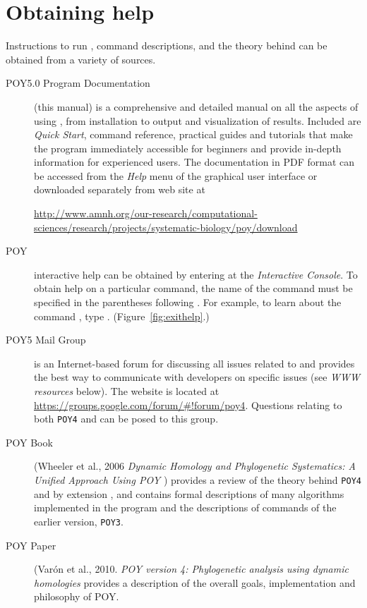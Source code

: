 {\section{Obtaining help} \label{sec:help}
Instructions to run \poy, command descriptions, and the theory behind \poy can be obtained from a variety of sources.
\begin{description}
\item[POY5.0 Program Documentation] (this manual) is a comprehensive and detailed manual on all the aspects of 
using \poy, from installation to output and visualization of results. Included are \emph{Quick Start}, \poy command 
reference, practical guides and tutorials that make the program immediately accessible for beginners and provide 
in-depth information for experienced users. The documentation in PDF format can be accessed from the \emph{Help} 
menu of the graphical user interface or downloaded separately from \poy web site at
\begin{center}
\url{http://www.amnh.org/our-research/computational-sciences/research/projects/systematic-biology/poy/download}
\end{center}
\item[POY] interactive help can be obtained by entering  at the \poy \emph{Interactive Console}. 
To obtain help on a particular command, the name of the command must be specified in the parentheses following 
. For example, to learn about the command , type . 
(Figure~\ref{fig:exithelp}.)
\item[POY5 Mail Group] is an Internet-based forum for discussing all issues related to \poy and provides the best way to 
communicate with \poy developers on specific issues (see \emph{WWW resources} below). The website is 
located at \url{https://groups.google.com/forum/#!forum/poy4}.  Questions relating to both \texttt{POY4} and \poy
can be posed to this group.
\item[POY Book] (Wheeler et al., 2006 \emph{Dynamic Homology and Phylogenetic Systematics: A Unified 
Approach Using POY} \cite{wheeleretal2006}) provides a review of the theory behind \texttt{POY4} and by extension 
\poy, and contains formal descriptions of many algorithms implemented in the program and the descriptions of commands 
of the earlier version, \texttt{POY3}.
\item[POY Paper] (Var\'on et al., 2010. \emph{POY version 4: Phylogenetic analysis using dynamic homologies} \cite{Varonetal2010} 
provides a description of the overall goals, implementation and philosophy of POY.


\end{description}}
